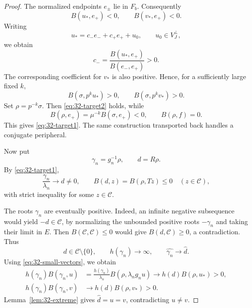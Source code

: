 \documentclass[11pt,reqno]{amsart}
\theoremstyle{plain}
\theoremstyle{definition}
\theoremstyle{remark}
\numberwithin{equation}{section}
\begin{document}
\begin{proof}
The normalized endpoints $e_\pm$ lie in $F_b$.
Consequently
\[
    B(u_*,e_+)<0,\qquad B(v_*,e_+)<0.
\]
Writing
\[
    u_*=c_-e_-+c_+e_++u_0,
    \qquad u_0\in V_J^\perp,
\]
we obtain
\[
    c_-=\frac{B(u_*,e_+)}{B(e_-,e_+)}>0.
\]
The corresponding coefficient for $v_*$ is also positive.
Hence, for a sufficiently large fixed $k$,
\[
    B(\sigma,p^ku_*)>0,\qquad
    B(\sigma,p^kv_*)>0.
\]
Set $\rho=p^{-k}\sigma$.
Then \eqref{eq:32-target2} holds, while
\[
    B(\rho,e_+)=\mu^{-k}B(\sigma,e_+)<0,
    \qquad
    B(\rho,f)=0.
\]
This gives \eqref{eq:32-target1}.
The same construction transported back handles a
conjugate peripheral.

Now put
\[
    \gamma_n=g_n^{-1}\rho,\qquad d=R\rho.
\]
By \eqref{eq:32-target1},
\[
    \frac{\gamma_n}{\lambda_n}\to d\ne0,
    \qquad
    B(d,z)=B(\rho,Tz)\leq0
    \quad(z\in\mathcal C),
\]
with strict inequality for some $z\in\mathcal C$.

The roots $\gamma_n$ are eventually positive.
Indeed, an infinite negative subsequence would yield
$-d\in\mathcal C$, by normalizing the unbounded positive
roots $-\gamma_n$ and taking their limit in $E$.
Then $B(\mathcal C,\mathcal C)\leq0$ would give
$B(d,\mathcal C)\geq0$, a contradiction.
Thus
\[
    d\in\mathcal C\setminus\{0\},
    \qquad
    h(\gamma_n)\to\infty,
    \qquad
    \widehat{\gamma_n}\to\widehat d.
\]
Using \eqref{eq:32-small-vectors}, we obtain
\begin{align*}
    h(\gamma_n)B(\gamma_n,u)
    &=
    \frac{h(\gamma_n)}{\lambda_n}
    B(\rho,\lambda_ng_nu)
    \longrightarrow h(d)B(\rho,u_*)>0,\\
    h(\gamma_n)B(\gamma_n,v)
    &\longrightarrow h(d)B(\rho,v_*)>0.
\end{align*}
Lemma~\ref{lem:32-extreme} gives
$\widehat d=u=v$, contradicting $u\ne v$.
\end{proof}
\end{document}
